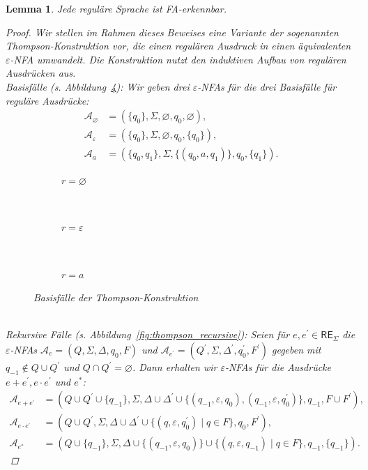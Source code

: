 \documentclass[11pt, a4paper]{article}
\theoremstyle{definition}
\theoremstyle{plain}
\newtheorem{lemma}[definition]{Lemma}
\numberwithin{equation}{section}
\let\emptyset\varnothing
\begin{document}
\begin{lemma}\label{lem:regex2nfa}
	Jede reguläre Sprache ist FA-erkennbar.
	\begin{proof}
		Wir stellen im Rahmen dieses Beweises eine Variante der sogenannten Thompson-Konstruktion vor, die einen regulären Ausdruck in einen äquivalenten \( \varepsilon \)-NFA umwandelt. Die Konstruktion nutzt den induktiven Aufbau von regulären Ausdrücken aus.\\
		Basisfälle (s. Abbildung~\ref{fig:thompson_basic}): 
		Wir geben drei \(\varepsilon\)-NFAs für die drei Basisfälle für reguläre Ausdrücke: 
		\begin{align*}
			\mathcal{A}_\emptyset &= (\{q_0\}, \Sigma, \emptyset, q_0, \emptyset),\\
			\mathcal{A}_\varepsilon &= (\{q_0\}, \Sigma, \emptyset, q_0, \{q_0\}),\\
			\mathcal{A}_a &= (\{q_0, q_1\}, \Sigma, \{(q_0, a, q_1)\}, q_0, \{q_1\}).
		\end{align*}
		\begin{figure}
			\centering
			\begin{subfigure}[b]{.25\textwidth}
				\centering
				
				\caption{\( r = \emptyset \)}
				\label{fig:thompson_empty}
			\end{subfigure}~
			\begin{subfigure}[b]{.25\textwidth}
				\centering
				
				\caption{\( r = \varepsilon \)}
				\label{fig:thompson_eps}
			\end{subfigure}~
			\begin{subfigure}[b]{.4\textwidth}
				\centering
				
				\caption{\( r = a \)}
				\label{fig:thompson_symbol}
			\end{subfigure}
			\caption{Basisfälle der Thompson-Konstruktion}
			\label{fig:thompson_basic}
		\end{figure}\\
		Rekursive Fälle (s. Abbildung~\ref{fig:thompson_recursive}):
		Seien für \( e, e^\prime \in \mathsf{RE}_\Sigma \) die \(\varepsilon\)-NFAs \( \mathcal{A}_e = (Q, \Sigma, \Delta, q_0, F) \) und \( \mathcal{A}_{e^\prime} = (Q^\prime, \Sigma, \Delta^\prime, q_0^\prime, F^\prime) \) gegeben mit \( q_{-1} \notin Q \cup Q^\prime \) und \( Q \cap Q^\prime = \emptyset \). Dann erhalten wir \(\varepsilon\)-NFAs für die Ausdrücke \( e+e^\prime, e \cdot e^\prime\) und \( e^\ast \):
		\begin{align*}
			\mathcal{A}_{e+e^\prime} &= (Q \cup Q^\prime \cup \{q_{-1}\}, \Sigma, \Delta \cup \Delta^\prime \cup \{(q_{-1}, \varepsilon, q_0), (q_{-1}, \varepsilon, q_0^\prime)\}, q_{-1}, F \cup F^\prime),\\
			\mathcal{A}_{e \cdot e^\prime} &= (Q \cup Q^\prime, \Sigma, \Delta \cup \Delta^\prime \cup \{(q, \varepsilon, q_0^\prime) \mid q \in F \}, q_0, F^\prime),\\
			\mathcal{A}_{e^\ast} &= (Q \cup \{q_{-1}\}, \Sigma, \Delta \cup \{(q_{-1}, \varepsilon, q_0)\} \cup \{(q, \varepsilon, q_{-1}) \mid q \in F \}, q_{-1}, \{q_{-1}\}).
		\end{align*}
		

\end{proof}
\end{lemma}
\end{document}
